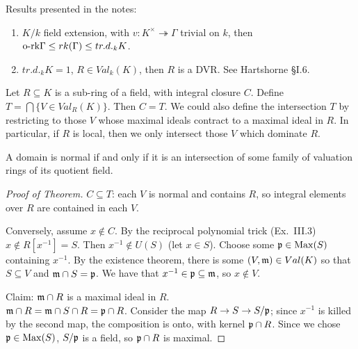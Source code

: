  \setcounter{lecture}{36}

 Results presented in the notes:
 \begin{enumerate}
   \item $K/k$ field extension, with $v:K^\times\twoheadrightarrow \Gamma$ trivial on
   $k$, then $\textrm{o-rk} \Gamma \le rk(\Gamma) \le tr.d._k K$.

   \item $tr.d._k K=1$, $R\in Val_k(K)$, then $R$ is a DVR. See Hartshorne \S I.6.
 \end{enumerate}

 \begin{theorem}
   Let $R\subseteq K$ is a sub-ring of a field, with integral closure $C$. Define
   $T=\bigcap \{V\in Val_R(K)\}$. Then $C=T$. We could also define the intersection $T$
   by restricting to those $V$ whose maximal ideals contract to a maximal ideal in $R$.
   In particular, if $R$ is local, then we only intersect those $V$ which dominate $R$.
 \end{theorem}
 \begin{corollary}
   A domain is normal if and only if it is an intersection of some family of valuation
   rings of its quotient field.
 \end{corollary}
 \begin{proof}[Proof of Theorem]
   $C\subseteq T$: each $V$ is normal and contains $R$, so integral elements over
   $R$ are contained in each $V$.

   Conversely, assume $x\not\in C$. By the reciprocal polynomial trick (Ex.~III.3)
   $x\not\in R[x^{-1}]=S$. Then $x^{-1}\notin U(S)$ (let $x\in S$). Choose some $\mathfrak{p}\in
   \operatorname{Max}(S)$ containing $x^{-1}$. By the existence theorem, there is some $(V,\mathfrak{m})\in
   Val(K)$ so that $S\subseteq V$ and $\mathfrak{m}\cap S=\mathfrak{p}$. We have that $x^{-1}\in \mathfrak{p}\subseteq
   \mathfrak{m}$, so $x\not\in V$.

   Claim: $\mathfrak{m}\cap R$ is a maximal ideal in $R$.\\
   $\mathfrak{m}\cap R = \mathfrak{m}\cap S\cap R = \mathfrak{p}\cap R$. Consider the map $R\to S\to S/\mathfrak{p}$; since
   $x^{-1}$ is killed by the second map, the composition is onto, with kernel $\mathfrak{p}\cap R$.
   Since we chose $\mathfrak{p}\in \operatorname{Max} (S)$, $S/\mathfrak{p}$ is a field, so $\mathfrak{p}\cap R$ is maximal.
 \end{proof}


